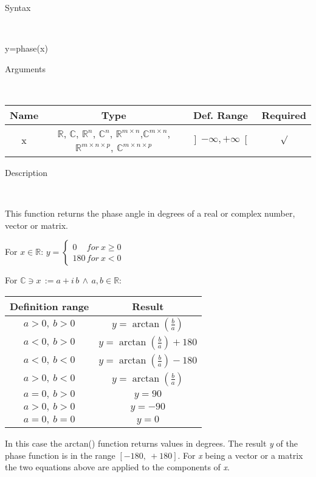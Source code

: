 \begin{description}
\item [Syntax]~
\end{description}
y=phase(x)

\begin{description}
\item [Arguments]~
\end{description}
\begin{tabular}{|c|c|c|c|}
\hline 
Name&
Type&
Def. Range&
Required\tabularnewline
\hline
\hline 
x&
$\mathbb{R}$, $\mathbb{C}$, $\mathbb{R}^{n}$, $\mathbb{C}^{n}$,
$\mathbb{\mathbb{R}}^{m\times n}$,$\mathbb{\mathbb{C}}^{m\times n}$,
$\mathbb{\mathbb{R}}^{m\times n\times p}$, $\mathbb{\mathbb{C}}^{m\times n\times p}$&
$\left]-\infty,+\infty\right[$&
$\surd$\tabularnewline
\hline
\end{tabular}

\begin{description}
\item [Description]~
\end{description}
This function returns the phase angle in degrees of a real or complex
number, vector or matrix.

\medskip{}
For $x\in\mathbb{R}$: $y=\left\{ \begin{array}{l}
0\quad\, for\: x\geq0\\
180\, for\: x<0\end{array}\right.$
\medskip{}

For $\mathbb{\mathbb{C}}\ni x\,:=a+i\, b\,\wedge\, a,b\in\mathbb{R}$:

\medskip{}
\begin{tabular}{|c|c|}
\hline 
Definition range&
Result\tabularnewline
\hline
\hline 
$a>0,\: b>0$&
$y=\arctan\left({\textstyle \frac{b}{a}}\right)$\tabularnewline
\hline 
$a<0,\: b>0$&
$y=\arctan\left(\frac{b}{a}\right)+180$\tabularnewline
\hline 
$a<0,\: b<0$&
$y=\arctan\left(\frac{b}{a}\right)-180$\tabularnewline
\hline 
$a>0,\: b<0$&
$y=\arctan\left(\frac{b}{a}\right)$\tabularnewline
\hline 
$a=0,\: b>0$&
$y=90$\tabularnewline
\hline 
$a>0,\: b>0$&
$y=-90$\tabularnewline
\hline 
$a=0,\: b=0$&
$y=0$\tabularnewline
\hline
\end{tabular}
\medskip{}

In this case the arctan() function returns values in degrees. The
result \textit{y} of the phase function is in the range $\left[-180,\:+180\right]$.
For \textit{x} being a vector or a matrix the two equations above
are applied to the components of \textit{x}.

